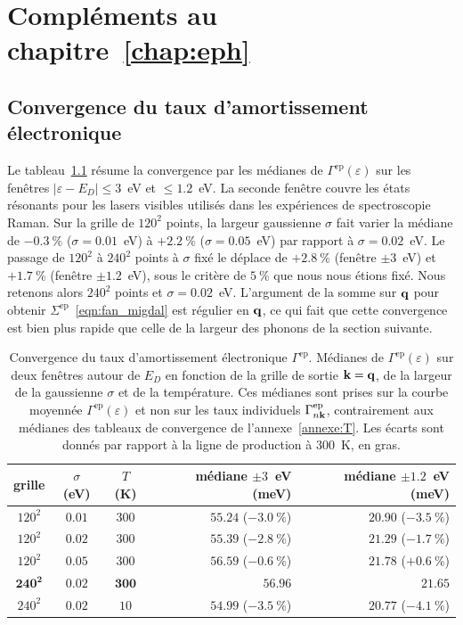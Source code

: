 \chapter{Compléments au chapitre~\ref{chap:eph}}\label{annexe:eph}

\section{Convergence du taux d'amortissement électronique}\label{sec:annexe_conv_gamma_ep}

Le tableau~\ref{tab:gamma_ep_conv} résume la convergence par les médianes de $\Gamma^\text{ep}(\varepsilon)$ sur les fenêtres $|\varepsilon-E_D|\leq 3$~eV et $\leq 1.2$~eV. La seconde fenêtre couvre les états résonants pour les lasers visibles utilisés dans les expériences de spectroscopie Raman. Sur la grille de $120^2$ points, la largeur gaussienne $\sigma$ fait varier la médiane de $-0.3~\%$ ($\sigma=0.01$~eV) à $+2.2~\%$ ($\sigma=0.05$~eV) par rapport à $\sigma=0.02$~eV. Le passage de $120^2$ à $240^2$ points à $\sigma$ fixé le déplace de $+2.8~\%$ (fenêtre $\pm 3$~eV) et $+1.7~\%$ (fenêtre $\pm 1.2$~eV), sous le critère de $5~\%$ que nous nous étions fixé. Nous retenons alors $240^2$ points et $\sigma=0.02$~eV. L'argument de la somme sur $\mathbf{q}$ pour obtenir $\Sigma^\text{ep}$~\eqref{eqn:fan_migdal} est régulier en $\mathbf{q}$, ce qui fait que cette convergence est bien plus rapide que celle de la largeur des phonons de la section suivante.
\vspace*{\fill}
\begin{table}[htbp]
    \centering
    \caption[Convergence du taux d'amortissement électronique $\Gamma^\text{ep}$.]{Convergence du taux d'amortissement électronique $\Gamma^\text{ep}$. Médianes de $\Gamma^\text{ep}(\varepsilon)$ sur deux fenêtres autour de $E_D$ en fonction de la grille de sortie $\mathbf{k}=\mathbf{q}$, de la largeur de la gaussienne $\sigma$ et de la température. Ces médianes sont prises sur la courbe moyennée $\Gamma^\text{ep}(\varepsilon)$ et non sur les taux individuels $\Gamma^\text{ep}_{n\mathbf{k}}$, contrairement aux médianes des tableaux de convergence de l'annexe~\ref{annexe:T}. Les écarts sont donnés par rapport à la ligne de production à $300$~K, en gras.}
    \label{tab:gamma_ep_conv}
    \begin{tabular}{cccrr}
        \hline\hline
        grille & $\sigma$ (eV) & $T$ (K) & médiane $\pm 3$~eV (meV) & médiane $\pm 1.2$~eV (meV) \\
        \hline
        $120^2$ & $0.01$ & $300$ & $55.24$ ($-3.0~\%$) & $20.90$ ($-3.5~\%$) \\
        $120^2$ & $0.02$ & $300$ & $55.39$ ($-2.8~\%$) & $21.29$ ($-1.7~\%$) \\
        $120^2$ & $0.05$ & $300$ & $56.59$ ($-0.6~\%$) & $21.78$ ($+0.6~\%$) \\
        $\mathbf{240^2}$ & $\mathbf{0.02}$ & $\mathbf{300}$ & $\mathbf{56.96}$ & $\mathbf{21.65}$ \\
        $240^2$ & $0.02$ & $10$ & $54.99$ ($-3.5~\%$) & $20.77$ ($-4.1~\%$) \\
        \hline\hline
    \end{tabular}
\end{table}
